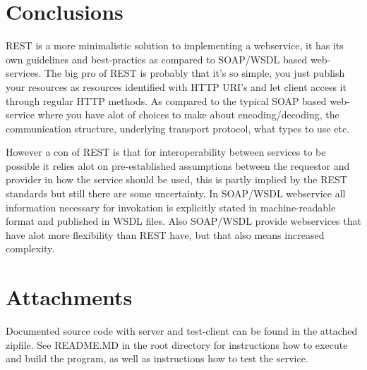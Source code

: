 \documentclass[a4paper, 11pt]{article}
\begin{document}
\section*{Conclusions}
REST is a more minimalistic solution to implementing a webservice, it has its own guidelines and best-practics as compared to SOAP/WSDL based web-services. The big pro of REST is probably that it's so simple, you just publish your resources as resources identified with HTTP URI's and let client access it through regular HTTP methods. As compared to the typical SOAP based web-service where you have alot of choices to make about encoding/decoding, the communication structure, underlying transport protocol, what types to use etc.

However a con of REST is that for interoperability between services to be possible it relies alot on pre-established assumptions between the requestor and provider in how the service should be used, this is partly implied by the REST standards but still there are some uncertainty. In SOAP/WSDL webservice all information necessary for invokation is explicitly stated in machine-readable format and published in WSDL files. Also SOAP/WSDL provide webservices that have alot more flexibility than REST have, but that also means increased complexity.

\section*{Attachments}
Documented source code with server and test-client can be found in the attached zipfile. See README.MD in the root directory for instructions how to execute and build the program, as well as instructions how to test the service.

{}

\end{document}
